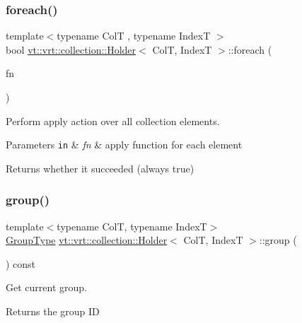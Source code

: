 \subsubsection{\texorpdfstring{foreach()}{foreach()}}
{\footnotesize\ttfamily template$<$typename ColT , typename IndexT $>$ \\
bool \hyperlink{structvt_1_1vrt_1_1collection_1_1_holder}{vt\+::vrt\+::collection\+::\+Holder}$<$ ColT, IndexT $>$\+::foreach (\begin{DoxyParamCaption}\item[{\hyperlink{structvt_1_1vrt_1_1collection_1_1_holder_a26e20d23447e935e218a07ffd638706d}{Func\+Apply\+Type}}]{fn }\end{DoxyParamCaption})}



Perform apply action over all collection elements. 


\begin{DoxyParams}[1]{Parameters}
\mbox{\tt in}  & {\em fn} & apply function for each element\\
\hline
\end{DoxyParams}
\begin{DoxyReturn}{Returns}
whether it succeeded (always true) 
\end{DoxyReturn}
\mbox{\label{structvt_1_1vrt_1_1collection_1_1_holder_a579e33999a2d66ded9c3751be3ba11f8}} 
\subsubsection{\texorpdfstring{group()}{group()}}
{\footnotesize\ttfamily template$<$typename ColT, typename IndexT$>$ \\
\hyperlink{namespacevt_a27b5e4411c9b6140c49100e050e2f743}{Group\+Type} \hyperlink{structvt_1_1vrt_1_1collection_1_1_holder}{vt\+::vrt\+::collection\+::\+Holder}$<$ ColT, IndexT $>$\+::group (\begin{DoxyParamCaption}{ }\end{DoxyParamCaption}) const\hspace{0.3cm}{\ttfamily [inline]}}



Get current group. 

\begin{DoxyReturn}{Returns}
the group ID 
\end{DoxyReturn}
\mbox{\label{structvt_1_1vrt_1_1collection_1_1_holder_afeafe4c77613531a166be80bdaea4fd6}} 
